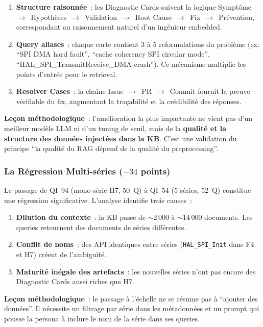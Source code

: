 \begin{enumerate}
  \item \textbf{Structure raisonnée}~: les Diagnostic Cards suivent la logique Symptôme~$\to$~Hypothèses~$\to$~Validation~$\to$~Root Cause~$\to$~Fix~$\to$~Prévention, correspondant au raisonnement naturel d'un ingénieur embedded.
  \item \textbf{Query aliases}~: chaque carte contient 3 à 5 reformulations du problème (ex: ``SPI DMA hard fault'', ``cache coherency SPI circular mode'', ``HAL\_SPI\_TransmitReceive\_DMA crash''). Ce mécanisme multiplie les points d'entrée pour le retrieval.
  \item \textbf{Resolver Cases}~: la chaîne Issue~$\to$~PR~$\to$~Commit fournit la preuve vérifiable du fix, augmentant la traçabilité et la crédibilité des réponses.
\end{enumerate}

\textbf{Leçon méthodologique}~: l'amélioration la plus impactante ne vient pas d'un meilleur modèle LLM ni d'un tuning de seuil, mais de la \textbf{qualité et la structure des données injectées dans la KB}. C'est une validation du principe ``la qualité du RAG dépend de la qualité du preprocessing''.

\subsubsection{La Régression Multi-séries ($-34$ points)}

Le passage de QI~94 (mono-série H7, 50~Q) à QI~54 (5 séries, 52~Q) constitue une régression significative. L'analyse identifie trois causes~:

\begin{enumerate}
  \item \textbf{Dilution du contexte}~: la KB passe de $\sim$2\,000 à $\sim$14\,000 documents. Les queries retournent des documents de séries différentes.
  \item \textbf{Conflit de noms}~: des API identiques entre séries (\texttt{HAL\_SPI\_Init} dans F4 et H7) créent de l'ambiguïté.
  \item \textbf{Maturité inégale des artefacts}~: les nouvelles séries n'ont pas encore des Diagnostic Cards aussi riches que H7.
\end{enumerate}

\textbf{Leçon méthodologique}~: le passage à l'échelle ne se résume pas à ``ajouter des données''. Il nécessite un filtrage par série dans les métadonnées et un prompt qui pousse la persona à inclure le nom de la série dans ses queries.

